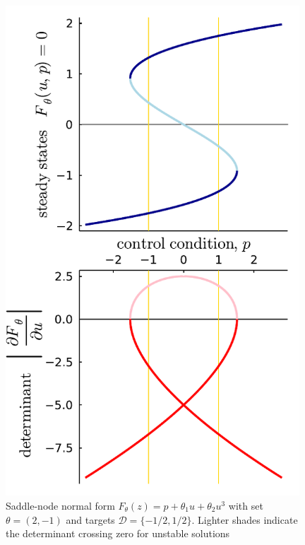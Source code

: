\documentclass{article}[12pt]
\numberwithin{equation}{section}
\begin{document}
\begin{figure}[H]
\centering{}
\captionsetup{justification=centering}
\includegraphics[width=11cm]{docs/figures/saddle-node}
\caption{Saddle-node normal form $F_{\theta}(z) = p + \theta_{1}u+\theta_{2}u^3$ with set $\theta=(2,-1)$ and targets $\mathcal{D}=\{-1/2,1/2\}$. Lighter shades indicate the determinant crossing zero for unstable solutions}
\label{fig:saddle-node}
\end{figure}
\end{document}
